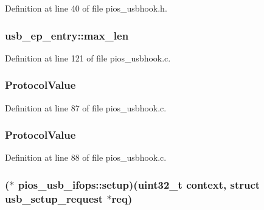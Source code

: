 Definition at line 40 of file pios\-\_\-usbhook.\-h.

\hypertarget{group___p_i_o_s___u_s_b_h_o_o_k_ga010957cf5bf2628ba64249b8c1271f91}{
\subsubsection[{max\-\_\-len}]{ usb\-\_\-ep\-\_\-entry\-::max\-\_\-len}}\label{group___p_i_o_s___u_s_b_h_o_o_k_ga010957cf5bf2628ba64249b8c1271f91}


Definition at line 121 of file pios\-\_\-usbhook.\-c.

\hypertarget{group___p_i_o_s___u_s_b_h_o_o_k_ga271c451896dad2b849277faad3eb3ea6}{
\subsubsection[{Protocol\-Value}]{ Protocol\-Value}}\label{group___p_i_o_s___u_s_b_h_o_o_k_ga271c451896dad2b849277faad3eb3ea6}


Definition at line 87 of file pios\-\_\-usbhook.\-c.

\hypertarget{group___p_i_o_s___u_s_b_h_o_o_k_ga271c451896dad2b849277faad3eb3ea6}{
\subsubsection[{Protocol\-Value}]{ Protocol\-Value}}\label{group___p_i_o_s___u_s_b_h_o_o_k_ga271c451896dad2b849277faad3eb3ea6}


Definition at line 88 of file pios\-\_\-usbhook.\-c.

\hypertarget{group___p_i_o_s___u_s_b_h_o_o_k_gafc58e776c6ff79a3974ca6dc1decf467}{
\subsubsection[{setup}]{($\ast$ pios\-\_\-usb\-\_\-ifops\-::setup)({\bf uint32\-\_\-t} context, struct {\bf usb\-\_\-setup\-\_\-request} $\ast${\bf req})}}\label{group___p_i_o_s___u_s_b_h_o_o_k_gafc58e776c6ff79a3974ca6dc1decf467}


